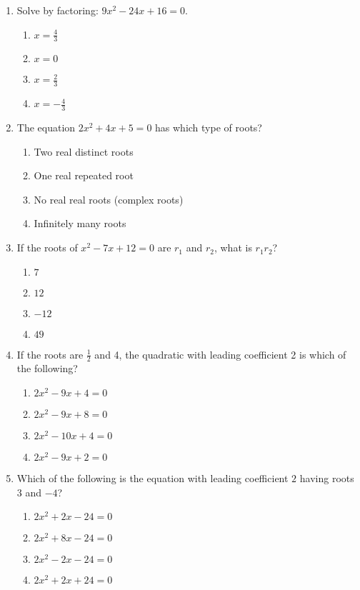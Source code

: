 \documentclass[12pt]{article}
\begin{document}
\begin{enumerate}
\item Solve by factoring: \(9x^2 - 24x + 16 = 0\).

\begin{enumerate}
  \item \(x = \tfrac{4}{3}\)
  \item \(x = 0\)
  \item \(x = \tfrac{2}{3}\)
  \item \(x = -\tfrac{4}{3}\)
\end{enumerate}

\item The equation \(2x^2 + 4x + 5 = 0\) has which type of roots?

\begin{enumerate}
  \item Two real distinct roots
  \item One real repeated root
  \item No real real roots (complex roots)
  \item Infinitely many roots
\end{enumerate}

\item If the roots of \(x^2 - 7x + 12 = 0\) are \(r_1\) and \(r_2\), what is \(r_1 r_2\)?

\begin{enumerate}
  \item \(7\)
  \item \(12\)
  \item \(-12\)
  \item \(49\)
\end{enumerate}

\item If the roots are \(\tfrac{1}{2}\) and 4, the quadratic with leading coefficient 2 is which of the following?

\begin{enumerate}
  \item \(2x^2 - 9x + 4 = 0\)
  \item \(2x^2 - 9x + 8 = 0\)
  \item \(2x^2 - 10x + 4 = 0\)
  \item \(2x^2 - 9x + 2 = 0\)
\end{enumerate}

\item Which of the following is the equation with leading coefficient \(2\) having roots \(3\) and \(-4\)?

\begin{enumerate}
  \item \(2x^2 + 2x - 24 = 0\)
  \item \(2x^2 + 8x - 24 = 0\)
  \item \(2x^2 - 2x - 24 = 0\)
  \item \(2x^2 + 2x + 24 = 0\)
\end{enumerate}


\end{enumerate}
\end{document}
